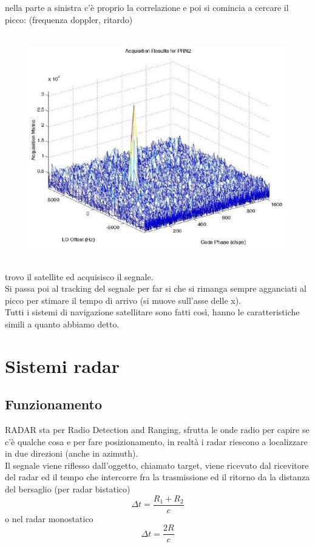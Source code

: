 \documentclass[oneside, 12pt]{extbook}
\begin{document}
nella parte a sinistra c'è proprio la correlazione e poi si comincia a cercare il picco: (frequenza doppler, ritardo)\\\\
\begin{figure}[!h]
	\includegraphics[scale=0.4]{immagini/localization/gps_correlation.png}
\end{figure}\\
trovo il satellite ed acquisisco il segnale.\\
Si passa poi al tracking del segnale per far si che si rimanga sempre agganciati al picco per stimare il tempo di arrivo (si muove sull'asse delle x).\\
Tutti i sistemi di navigazione satellitare sono fatti così, hanno le caratteristiche simili a quanto abbiamo detto.

\chapter{Sistemi radar}

\section{Funzionamento}
RADAR sta per Radio Detection and Ranging, sfrutta le onde radio per capire se c'è qualche cosa e per fare posizionamento, in realtà i radar riescono a localizzare in due direzioni (anche in azimuth).\\
Il segnale viene riflesso dall'oggetto, chiamato target, viene ricevuto dal ricevitore del radar ed il tempo che intercorre fra la trasmissione ed il ritorno da la distanza del bersaglio (per radar bistatico)
\begin{equation}
	\Delta t = \frac{R_1 + R_2}{c}
\end{equation}
o nel radar monostatico
\begin{equation}
	\Delta t = \frac{2R}{c}
\end{equation}
\end{document}
